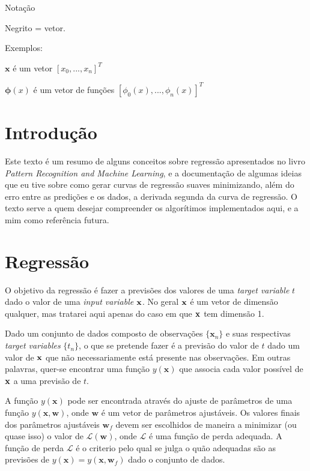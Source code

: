\documentclass{article}
\begin{document}
Notação

Negrito = vetor.

Exemplos:

\(\textbf{x}\) é um vetor \([x_0,...,x_n]^T\)

\(\boldsymbol{\phi}(x)\) é um vetor de funções \([\phi_0(x),...,\phi_n(x)]^T\)

\section{Introdução}

Este texto é um resumo de alguns conceitos sobre regressão apresentados no livro \emph{Pattern Recognition and Machine Learning},
e a documentação de algumas ideias que eu tive sobre como gerar curvas de regressão suaves minimizando, além
do erro entre as predições e os dados, a derivada segunda da curva de regressão. O texto serve a quem
desejar compreender os algorítimos implementados aqui, e a mim como referência futura.

\section{Regressão}

O objetivo da regressão é fazer a previsões dos valores de uma \emph{target variable} \(t\) dado o valor de uma
\emph{input variable} \(\bf x\). No geral \(\bf x\) é um vetor de dimensão qualquer, mas tratarei aqui apenas do
caso em que \( \bf x \) tem dimensão 1.

Dado um conjunto de dados composto de observações \( \{ \textbf{x}_n \} \) e suas respectivas
\emph{target variables} \( \{t_n\} \), o que se pretende fazer é a previsão do valor de \(t\)
dado um valor de \(\bf x\) que não necessariamente está presente nas observações. Em outras palavras,
quer-se encontrar uma função \( y(\textbf{x}) \) que associa cada valor possível de \(\bf x\) a uma previsão de
\(t\).

A função \( y(\textbf{x}) \) pode ser encontrada através do ajuste de parâmetros de uma função
\( y(\textbf{x}, \textbf{w}) \), onde \( \textbf{w} \) é um vetor de parâmetros ajustáveis. Os valores
finais dos parâmetros ajustáveis \( \textbf{w}_f \) devem ser escolhidos de maneira a minimizar
(ou quase isso) o valor de \( \mathcal{L}(\textbf{w}) \), onde \( \mathcal{L} \) é uma função de perda
adequada. A função de perda \( \mathcal{L} \) é o criterio pelo qual se julga o quão adequadas são as
previsões de \( y(\textbf{x}) = y(\textbf{x}, \textbf{w}_f) \) dado o conjunto de dados.
\end{document}
